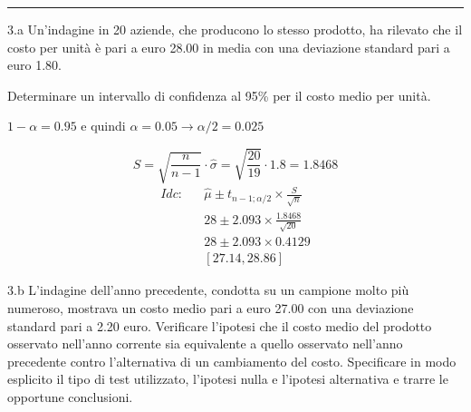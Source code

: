 \documentclass[
  11pt,
]{book}
\theoremstyle{mytheoremstyle}
\theoremstyle{mydefstyle}
\newenvironment{sol}
  {
  \begin{tcolorbox}[enhanced,breakable,arc=0.1mm,boxrule=1pt,colback=white,colframe=iblue,
  title=\bf \fontfamily{lmss}\selectfont \hspace{.5 cm} Soluzione,drop fuzzy shadow]

}{
\end{tcolorbox}
  }
\begin{document}
\begin{center}\rule{0.5\linewidth}{0.5pt}\end{center}

3.a Un'indagine in 20 aziende, che producono lo stesso prodotto,
ha rilevato che il costo per unità è pari a euro 28.00
in media con una deviazione standard pari a euro 1.80.

Determinare un intervallo di confidenza al 95\%
per il costo medio per unità.

\begin{sol}
\(1-\alpha =0.95\) e quindi \(\alpha=0.05\rightarrow \alpha/2=0.025\)

\[
      S  =\sqrt{\frac {n}{n-1}}\cdot\hat\sigma =
     \sqrt{\frac { 20 }{ 19 }}\cdot 1.8 = 1.8468 
\]
\begin{eqnarray*}
  Idc: & &  \hat\mu \pm  t_{n-1;\alpha/2} \times \frac{S}{\sqrt{n}} \\
     & &  28 \pm  2.093 \times \frac{ 1.8468 }{\sqrt{ 20 }} \\
     & &  28 \pm  2.093 \times  0.4129 \\
     & & [ 27.14 ,  28.86 ]
\end{eqnarray*}

\end{sol}

3.b L'indagine dell'anno precedente, condotta
su un campione molto più numeroso, mostrava un costo medio
pari a euro 27.00 con una deviazione standard pari a 2.20 euro.
Verificare l'ipotesi che il costo medio del prodotto osservato
nell'anno corrente sia equivalente a quello osservato nell'anno
precedente contro l'alternativa di un cambiamento del costo.
Specificare in modo esplicito il tipo di test utilizzato,
l'ipotesi nulla e l'ipotesi alternativa e trarre le opportune
conclusioni.
\end{document}
